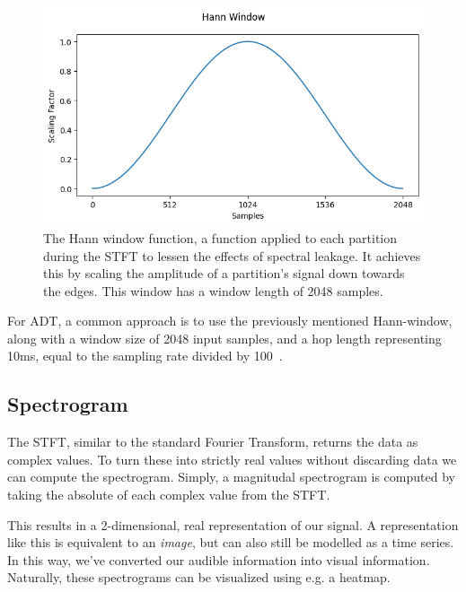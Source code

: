 \begin{figure}[H]
    \centering
    \includegraphics[scale=0.8]{figures/hann}
    \caption{The Hann window function, a function applied to each partition during the \gls{STFT} to lessen the effects of spectral leakage. It achieves this by scaling the amplitude of a partition's signal down towards the edges. This window has a window length of 2048 samples.}
    \label{HannWindowFigure}
\end{figure}

For \gls{ADT}, a common approach is to use the previously mentioned Hann-window, along with a window size of 2048 input samples, and a hop length representing 10ms, equal to the sampling rate divided by 100~\cite{8350302, vogl2016recurrent,vogl2018multiinstrumentdrumtranscription, signals4040042}.

\subsection{Spectrogram}

The \gls{STFT}, similar to the standard Fourier Transform, returns the data as complex values. To turn these into strictly real values without discarding data we can compute the spectrogram. Simply, a magnitudal spectrogram is computed by taking the absolute of each complex value from the \gls{STFT}.

This results in a 2-dimensional, real representation of our signal. A representation like this is equivalent to an \textit{image}, but can also still be modelled as a time series. In this way, we've converted our audible information into visual information. Naturally, these spectrograms can be visualized using e.g. a heatmap.

